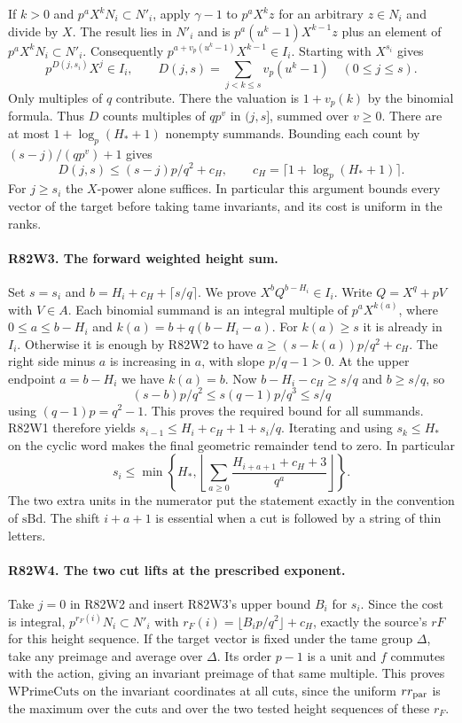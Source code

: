 If $k>0$ and $p^aX^kN_i\subset N'_i$, apply $\gamma-1$ to
$p^aX^kz$ for an arbitrary $z\in N_i$ and divide by $X$.
The result lies in $N'_i$ and is
$p^a(u^k-1)X^{k-1}z$ plus an element of $p^aX^kN_i\subset N'_i$.
Consequently $p^{a+v_p(u^k-1)}X^{k-1}\in I_i$.
Starting with $X^{s_i}$ gives
\[
  p^{D(j,s_i)}X^j\in I_i,\qquad
  D(j,s)=\sum_{j<k\le s}v_p(u^k-1)\quad(0\le j\le s).
\]
Only multiples of $q$ contribute. There the valuation is
$1+v_p(k)$ by the binomial formula. Thus $D$ counts multiples
of $qp^v$ in $(j,s]$, summed over $v\ge0$. There are at most
$1+\log_p(H_*+1)$ nonempty summands. Bounding each count by
$(s-j)/(qp^v)+1$ gives
\[
 D(j,s)\le (s-j)p/q^2+c_H,\qquad
 c_H=\lceil 1+\log_p(H_*+1)\rceil .
\]
For $j\ge s_i$ the $X$-power alone suffices. In particular this
argument bounds every vector of the target before taking tame
invariants, and its cost is uniform in the ranks.

\paragraph{R82W3. The forward weighted height sum.}
Set $s=s_i$ and $b=H_i+c_H+\lceil s/q\rceil$. We prove
$X^bQ^{b-H_i}\in I_i$. Write $Q=X^q+pV$ with $V\in A$.
Each binomial summand is an integral multiple of
$p^aX^{k(a)}$, where $0\le a\le b-H_i$ and
$k(a)=b+q(b-H_i-a)$. For $k(a)\ge s$ it is already in $I_i$.
Otherwise it is enough by R82W2 to have
$a\ge(s-k(a))p/q^2+c_H$. The right side minus $a$
is increasing in $a$, with slope $p/q-1>0$. At the upper
endpoint $a=b-H_i$ we have $k(a)=b$. Now
$b-H_i-c_H\ge s/q$ and $b\ge s/q$, so
\[
 (s-b)p/q^2\le s(q-1)p/q^3\le s/q
\]
using $(q-1)p=q^2-1$. This proves the required bound for all
summands. R82W1 therefore yields
$s_{i-1}\le H_i+c_H+1+s_i/q$. Iterating and using
$s_k\le H_*$ on the cyclic word makes the final geometric
remainder tend to zero. In particular
\[
   s_i\le\min\left\{H_*,
    \left\lfloor\sum_{a\ge0}
         \frac{H_{i+a+1}+c_H+3}{q^a}\right\rfloor\right\}.
\]
The two extra units in the numerator put the statement exactly
in the convention of $\mathrm{sBd}$. The shift $i+a+1$ is
essential when a cut is followed by a string of thin letters.

\paragraph{R82W4. The two cut lifts at the prescribed exponent.}
Take $j=0$ in R82W2 and insert R82W3's upper bound $B_i$ for
$s_i$. Since the cost is integral, $p^{r_F(i)}N_i\subset N'_i$
with $r_F(i)=\lfloor B_i p/q^2\rfloor+c_H$, exactly the
source's $rF$ for this height sequence. If the target vector is
fixed under the tame group $\Delta$, take any preimage and average
over $\Delta$. Its order $p-1$ is a unit and $f$ commutes with the
action, giving an invariant preimage of that same multiple.
This proves $\mathrm{WPrimeCuts}$ on the invariant coordinates at
all cuts, since the uniform $rr_{\rm par}$ is the maximum over
the cuts and over the two tested height sequences of these $r_F$.

